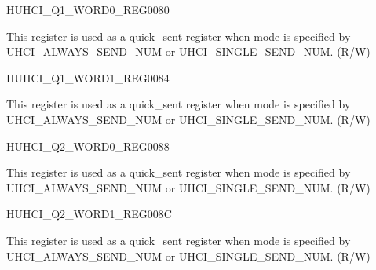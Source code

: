 \begin{register}{H}{UHCI\_Q1\_WORD0\_REG}{\hexprefix{}0080}\label{regdesc:UHCIQ1WORD0REG}
%
\regnewline%
\begin{regdesc}\begin{reglist}
\label{fielddesc:UHCISENDQ1WORD0}\item [UHCI\_SEND\_Q1\_WORD0] This register is used as a quick\_sent register when mode is specified by UHCI\_ALWAYS\_SEND\_NUM or UHCI\_SINGLE\_SEND\_NUM. (R/W)
\end{reglist}\end{regdesc}
\end{register}


\begin{register}{H}{UHCI\_Q1\_WORD1\_REG}{\hexprefix{}0084}\label{regdesc:UHCIQ1WORD1REG}
%
\regnewline%
\begin{regdesc}\begin{reglist}
\label{fielddesc:UHCISENDQ1WORD1}\item [UHCI\_SEND\_Q1\_WORD1] This register is used as a quick\_sent register when mode is specified by UHCI\_ALWAYS\_SEND\_NUM or UHCI\_SINGLE\_SEND\_NUM. (R/W)
\end{reglist}\end{regdesc}
\end{register}


\begin{register}{H}{UHCI\_Q2\_WORD0\_REG}{\hexprefix{}0088}\label{regdesc:UHCIQ2WORD0REG}
%
\regnewline%
\begin{regdesc}\begin{reglist}
\label{fielddesc:UHCISENDQ2WORD0}\item [UHCI\_SEND\_Q2\_WORD0] This register is used as a quick\_sent register when mode is specified by UHCI\_ALWAYS\_SEND\_NUM or UHCI\_SINGLE\_SEND\_NUM. (R/W)
\end{reglist}\end{regdesc}
\end{register}


\begin{register}{H}{UHCI\_Q2\_WORD1\_REG}{\hexprefix{}008C}\label{regdesc:UHCIQ2WORD1REG}
%
\regnewline%
\begin{regdesc}\begin{reglist}
\label{fielddesc:UHCISENDQ2WORD1}\item [UHCI\_SEND\_Q2\_WORD1] This register is used as a quick\_sent register when mode is specified by UHCI\_ALWAYS\_SEND\_NUM or UHCI\_SINGLE\_SEND\_NUM. (R/W)
\end{reglist}\end{regdesc}
\end{register}



